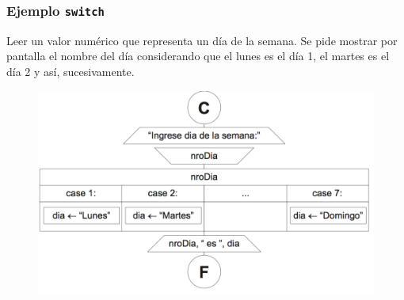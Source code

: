 \documentclass[handout]{beamer}
\begin{document}
\begin{frame}[t]\frametitle{Ejemplo \texttt{switch}}
    
Leer un valor numérico que representa un día de la semana. Se pide mostrar por pantalla el nombre del día considerando que el lunes es el día 1, el martes es el día 2 y así, sucesivamente.

\begin{figure}[tb]
    \centering
    \includegraphics[scale=.6]{./img/ejswitch}
\end{figure}

\end{frame}


\end{document}
